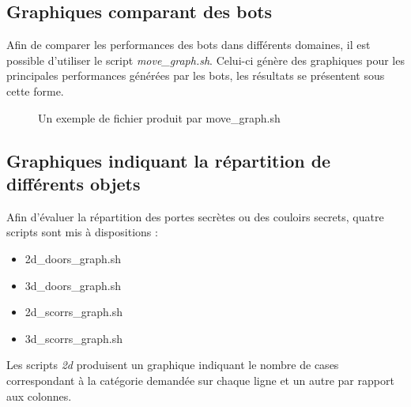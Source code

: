 \documentclass[10pt,a4paper]{report}
\begin{document}
\subsection{Graphiques comparant des bots}
Afin de comparer les performances des bots dans différents domaines, il est
possible d'utiliser le script \emph{move\_graph.sh}. Celui-ci génère des
graphiques pour les principales performances générées par les bots, les
résultats se présentent sous cette forme.

\begin{figure}[H]
  \caption{\label{fig:move_graph} Un exemple de fichier produit par move\_graph.sh}
\end{figure}

\subsection{Graphiques indiquant la répartition de différents objets}
Afin d'évaluer la répartition des portes secrètes ou des couloirs secrets,
quatre scripts sont mis à dispositions :

\begin{itemize}
\item 2d\_doors\_graph.sh
\item 3d\_doors\_graph.sh
\item 2d\_scorrs\_graph.sh
\item 3d\_scorrs\_graph.sh
\end{itemize}

Les scripts \emph{2d} produisent un graphique indiquant le nombre de cases
correspondant à la catégorie demandée sur chaque ligne et un autre par rapport
aux colonnes. 
\end{document}
